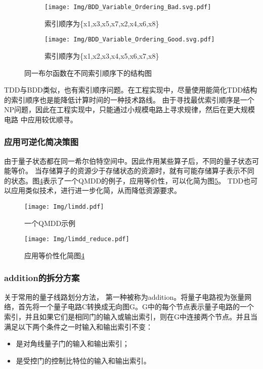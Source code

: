 \begin{figure}[!htbp]
	\centering
	\begin{subfigure}[b]{.4\textwidth}
        \centering
        \texttt{[image: Img/BDD\_Variable\_Ordering\_Bad.svg.pdf]}
		\caption{索引顺序为\{x1,x3,x5,x7,x2,x4,x6,x8\}}
		\label{fig:bdd-bad}
	\end{subfigure}
	\begin{subfigure}[b]{.4\textwidth}
        \centering
        \texttt{[image: Img/BDD\_Variable\_Ordering\_Good.svg.pdf]}
		\caption{索引顺序为\{x1,x2,x3,x4,x5,x6,x7,x8\}}
		\label{fig:bdd-good}
	\end{subfigure}
	\caption{同一布尔函数在不同索引顺序下的结构图\citep{wiki:bdd}}
	\label{fig:bdd-compare}
\end{figure}

TDD与BDD类似，也有索引顺序问题。在工程实现中，尽量使用能简化TDD结构的索引顺序也是能降低计算时间的一种技术路线。
由于寻找最优索引顺序是一个NP问题，因此在工程实现中，只能通过小规模电路上寻求规律，然后在更大规模电路
中应用较优顺寻。
\subsubsection{应用可逆化简决策图}
由于量子状态都在同一希尔伯特空间中。因此作用某些算子后，不同的量子状态可能等价。
当存储算子的资源少于存储状态的资源时，就有可能存储算子表示不同的状态\citep{vinkhuijzen2023limdd}。图\ref{fig:qmdd-example}表示了一个QMDD的例子，应用等价性，可以化简为图\ref{fig:limdd-example}。
TDD也可以应用类似技术，进行进一步化简，从而降低资源要求。
\begin{figure}[!htbp]
    \centering
    \texttt{[image: Img/limdd.pdf]}
    \caption{一个QMDD示例}
    \label{fig:qmdd-example}
\end{figure}
\begin{figure}[!htbp]
    \centering
    \texttt{[image: Img/limdd\_reduce.pdf]}
    \caption{应用等价性化简图\ref{fig:qmdd-example}}
    \label{fig:limdd-example}
\end{figure}
\subsubsection{addition的拆分方案}
\label{addition}
关于常用的量子线路划分方法，
第一种被称为addition\citep{chen2018classical}。将量子电路视为张量网络，首先将一个量子电路C转换成无向图G。G中的每个节点表示量子电路的一个索引，并且如果它们是相同门的输入或输出索引，则在G中连接两个节点。并且当满足以下两个条件之一时输入和输出索引不变：
\begin{itemize}
	\item 是对角线量子门的输入和输出索引；
	\item 是受控门的控制比特位的输入和输出索引。
\end{itemize}
	
